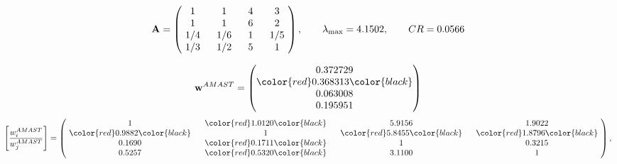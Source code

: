 \begin{example}
\begin{equation*}
\mathbf{A} =
\begin{pmatrix}
$\,\,$ 1 $\,\,$ & $\,\,$1$\,\,$ & $\,\,$4$\,\,$ & $\,\,$3 $\,\,$ \\
$\,\,$ 1 $\,\,$ & $\,\,$ 1 $\,\,$ & $\,\,$6$\,\,$ & $\,\,$2 $\,\,$ \\
$\,\,$ 1/4$\,\,$ & $\,\,$ 1/6$\,\,$ & $\,\,$ 1 $\,\,$ & $\,\,$ 1/5 $\,\,$ \\
$\,\,$ 1/3$\,\,$ & $\,\,$ 1/2$\,\,$ & $\,\,$5$\,\,$ & $\,\,$ 1  $\,\,$ \\
\end{pmatrix},
\qquad
\lambda_{\max} =
4.1502,
\qquad
CR = 0.0566
\end{equation*}

\begin{equation*}
\mathbf{w}^{AMAST} =
\begin{pmatrix}
0.372729\\
\color{red} 0.368313\color{black} \\
0.063008\\
0.195951
\end{pmatrix}\end{equation*}
\begin{equation*}
\left[ \frac{{w}^{AMAST}_i}{{w}^{AMAST}_j} \right] =
\begin{pmatrix}
$\,\,$ 1 $\,\,$ & $\,\,$\color{red} 1.0120\color{black} $\,\,$ & $\,\,$5.9156$\,\,$ & $\,\,$1.9022$\,\,$ \\
$\,\,$\color{red} 0.9882\color{black} $\,\,$ & $\,\,$ 1 $\,\,$ & $\,\,$\color{red} 5.8455\color{black} $\,\,$ & $\,\,$\color{red} 1.8796\color{black}   $\,\,$ \\
$\,\,$0.1690$\,\,$ & $\,\,$\color{red} 0.1711\color{black} $\,\,$ & $\,\,$ 1 $\,\,$ & $\,\,$0.3215 $\,\,$ \\
$\,\,$0.5257$\,\,$ & $\,\,$\color{red} 0.5320\color{black} $\,\,$ & $\,\,$3.1100$\,\,$ & $\,\,$ 1  $\,\,$ \\
\end{pmatrix},
\end{equation*}


\end{example}
